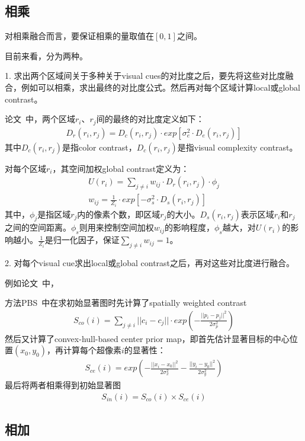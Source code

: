 \documentclass[12pt]{article}
\begin{document}
\subsection{相乘}

对相乘融合而言，要保证相乘的量取值在$[0, 1]$之间。

目前来看，分为两种。

1. 求出两个区域间关于多种关于visual cues的对比度之后，要先将这些对比度融合，例如可以相乘，求出最终的对比度公式。然后再对每个区域计算local或global contrast。

论文~\cite{zhu2014tag}中，两个区域$r_i$、$r_j$间的最终的对比度定义如下：
\begin{align}
D_r(r_i, r_j) = D_c(r_i, r_j) \cdot exp[\sigma_e^2 \cdot D_e(r_i, r_j)]
\end{align}
其中$D_c(r_i, r_j)$是指color contrast，$D_c(r_i, r_j)$是指visual complexity contrast。

对每个区域$r_i$，其空间加权global contrast定义为：
\begin{align}
U(r_i) = \sum_{j\ne i}w_{ij} \cdot D_r(r_i, r_j) \cdot \phi_j\\
w_{ij} = \frac{1}{Z_i}\cdot exp[-\sigma_s^2 \cdot D_s(r_i, r_j)]
\end{align}
其中，$\phi_j$是指区域$r_j$内的像素个数，即区域$r_j$的大小。$D_s(r_i, r_j)$表示区域$r_i$和$r_j$之间的空间距离。$\phi_s$则用来控制空间加权$w_{ij}$的影响程度，$\phi_s$越大，对$U(r_i)$的影响越小。$\frac{1}{Z_i}$是归一化因子，保证$\sum_{j \ne i}w_{ij} = 1$。

2. 对每个visual cue求出local或global contrast之后，再对这些对比度进行融合。

例如论文~\cite{yan2013hierarchical}中，

方法PBS~\cite{yang2013graph}中在求初始显著图时先计算了spatially weighted contrast
\begin{align}
S_{co}(i) = \sum_{j \ne i}||c_i-c_j|| \cdot exp\left(-\frac{||p_i-p_j||^2}{2\sigma_p^2}\right)
\end{align}
然后又计算了convex-hull-based center prior map，即首先估计显著目标的中心位置$(x_0, y_0)$，再计算每个超像素$i$的显著性：
\begin{align}
S_{ce}(i) = exp\left(-\frac{||x_i-x_0||^2}{2\sigma_x^2}-\frac{||y_i-y_0||^2}{2\sigma_y^2}\right)
\end{align}
最后将两者相乘得到初始显著图
\begin{align}
S_{in}(i) = S_{co}(i) \times S_{ce}(i)
\end{align}


\subsection{相加}
\end{document}
